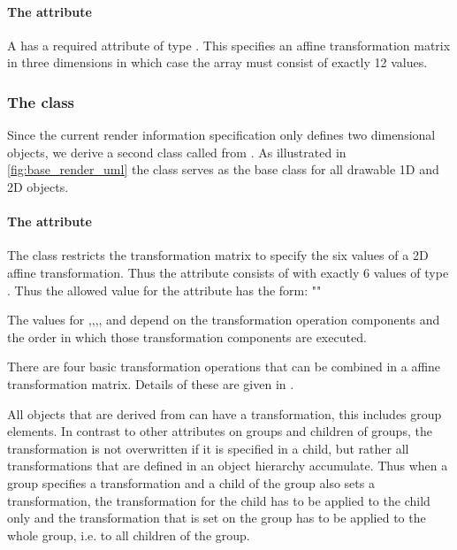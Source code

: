\paragraph{The \fixttspace{} attribute}

A \Transformation has a required attribute  of type \doubleArray. This specifies an affine transformation matrix in three dimensions in which case the array must consist of exactly 12 values.

\subsubsection{The  class}
\label{transformationtwod-class}

Since the current render information specification only defines two dimensional objects, we derive a second class called \TransformationTwoD from \Transformation. As illustrated in \ref{fig:base_render_uml} the class \TransformationTwoD serves as the base class for all drawable 1D and 2D objects.

\paragraph{The \fixttspace{} attribute}

The \TransformationTwoD class restricts the transformation matrix to specify the six values of a 2D affine transformation. Thus the  attribute consists of \doubleArray with exactly 6 values of type . Thus the allowed 
value for the attribute has the form: ""

The values for ,,,, and  depend on the transformation operation components and the order in which those transformation components are executed.

There are four basic transformation operations that can be combined in a affine transformation matrix.  Details of these are given in .

All objects that are derived from \TransformationTwoD can have a transformation, this includes group elements. In contrast to other attributes on groups and children of groups, the transformation is not overwritten if it is specified in a child, but rather all transformations that are defined in an object hierarchy accumulate. Thus when a group specifies a transformation and a child of the group also sets a transformation, the transformation for the child has to be applied to the child only and the transformation that is set on the group has to be applied to the whole group, i.e. to all children of the group.

